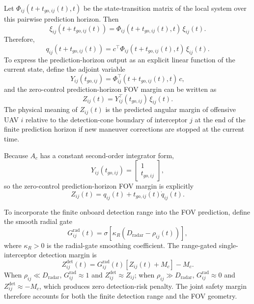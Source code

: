 \documentclass{cja}
\begin{document}
Let $\Phi_{ij}(t+t_{go,ij}(t),t)$ be the state-transition matrix of the local system over this pairwise prediction horizon. Then
\begin{equation}
\xi_{ij}\!\left(t+t_{go,ij}(t)\right)=\Phi_{ij}\!\left(t+t_{go,ij}(t),t\right)\,\xi_{ij}(t).
\end{equation}
Therefore,
\begin{equation}
q_{ij}\!\left(t+t_{go,ij}(t)\right)=c^{\top}\Phi_{ij}\!\left(t+t_{go,ij}(t),t\right)\,\xi_{ij}(t).
\end{equation}
To express the prediction-horizon output as an explicit linear function of the current state, define the adjoint variable
\begin{equation}
Y_{ij}(t_{go,ij})=\Phi_{ij}^{\top}\!\left(t+t_{go,ij}(t),t\right)\,c,
\end{equation}
and the zero-control prediction-horizon FOV margin can be written as
\begin{equation}
Z_{ij}(t)=Y_{ij}^{\top}(t_{go,ij})\,\xi_{ij}(t).
\end{equation}
The physical meaning of $Z_{ij}(t)$ is the predicted angular margin of offensive UAV $i$ relative to the detection-cone boundary of interceptor $j$ at the end of the finite prediction horizon if new maneuver corrections are stopped at the current time.

Because $A_c$ has a constant second-order integrator form,
\begin{equation}
Y_{ij}(t_{go,ij})
=
\begin{bmatrix}
1\\
t_{go,ij}
\end{bmatrix},
\end{equation}
so the zero-control prediction-horizon FOV margin is explicitly
\begin{equation}
Z_{ij}(t)
=
q_{ij}(t)+t_{go,ij}(t)\dot q_{ij}(t).
\end{equation}

To incorporate the finite onboard detection range into the FOV prediction, define the smooth radial gate
\begin{equation}
G_{ij}^{\mathrm{rad}}(t)
=
\sigma\!\left[\kappa_R\left(D_{\mathrm{radar}}-\rho_{ij}(t)\right)\right],
\end{equation}
where $\kappa_R>0$ is the radial-gate smoothing coefficient. The range-gated single-interceptor detection margin is
\begin{equation}
Z_{ij}^{\mathrm{det}}(t)
=
G_{ij}^{\mathrm{rad}}(t)\left[Z_{ij}(t)+M_c\right]-M_c.
\end{equation}
When $\rho_{ij}\ll D_{\mathrm{radar}}$, $G_{ij}^{\mathrm{rad}}\approx1$ and $Z_{ij}^{\mathrm{det}}\approx Z_{ij}$; when $\rho_{ij}\gg D_{\mathrm{radar}}$, $G_{ij}^{\mathrm{rad}}\approx0$ and $Z_{ij}^{\mathrm{det}}\approx-M_c$, which produces zero detection-risk penalty. The joint safety margin therefore accounts for both the finite detection range and the FOV geometry.
\end{document}
